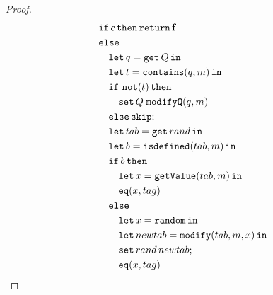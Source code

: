 \begin{proof}
{\begin{align*}
\begin{aligned}
    &\mathtt{if}\, c\, \mathtt{then}\, \mathtt{return}\, \mathbf{f} \\
    &\mathtt{else}\\
    &\quad\mathtt{let}\,q=\mathtt{get}\, Q\,\mathtt{in}\, \\
    &\quad\mathtt{let}\,t=\mathtt{contains}(q,m)\,\mathtt{in}\, \\
    &\quad \mathtt{if}\ \mathtt{not}(t)\,\mathtt{then} \\
    &\quad\quad \mathtt{set}\,Q\;\mathtt{modifyQ}(q,m) \\
    &\quad\mathtt{else}\,\mathtt{skip}; \\
    &\quad\mathtt{let}\,tab = \mathtt{get}\,rand\,\mathtt{in}\, \\
    &\quad\mathtt{let}\,b = \mathtt{isdefined}(tab, m)\,\mathtt{in}\, \\
    &\quad\mathtt{if}\, b\, \mathtt{then} \\
    &\quad\quad \mathtt{let}\,x = \mathtt{getValue}(tab, m)\,\mathtt{in}\, \\
    &\quad\quad \mathtt{eq}(x,tag) \\
    &\quad\mathtt{else} \\
    &\quad\quad \mathtt{let}\,x = \mathtt{random}\,\mathtt{in}\, \\
    &\quad\quad \mathtt{let}\,newtab = \mathtt{modify}(tab, m, x)\,\mathtt{in}\, \\
    &\quad\quad \mathtt{set}\,rand\,newtab; \\
    &\quad\quad \mathtt{eq}(x,tag)
\end{aligned}
\end{align*}
}

\normalsize


\end{proof}
